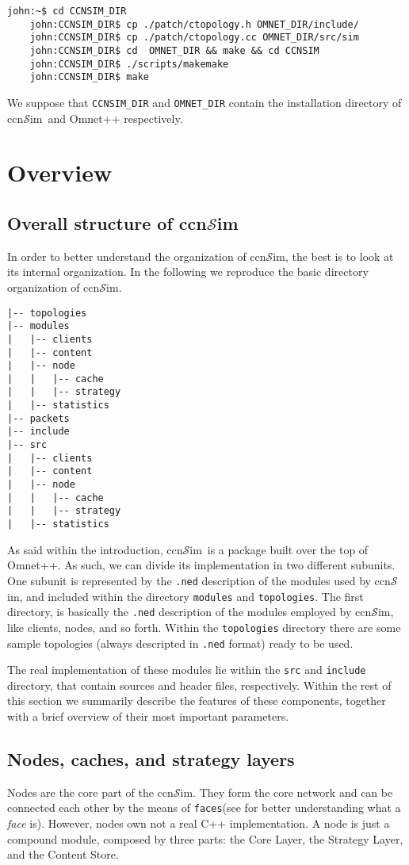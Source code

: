 \documentclass{article}
\newcommand{\ccnsim}{ccn$\mathcal{S}$im}
\begin{document}
\begin{Verbatim}[frame=single]
    john:~$ cd CCNSIM_DIR
    john:CCNSIM_DIR$ cp ./patch/ctopology.h OMNET_DIR/include/
    john:CCNSIM_DIR$ cp ./patch/ctopology.cc OMNET_DIR/src/sim
    john:CCNSIM_DIR$ cd  OMNET_DIR && make && cd CCNSIM
    john:CCNSIM_DIR$ ./scripts/makemake
    john:CCNSIM_DIR$ make
\end{Verbatim}
We suppose that \verb|CCNSIM_DIR| and \verb|OMNET_DIR| contain the installation directory of \ccnsim\ and Omnet++ respectively. 
\section{Overview}
\subsection{Overall structure of \ccnsim}
In order to better understand the organization of \ccnsim, the best is to look at its internal organization. In the following we reproduce the basic directory organization of \ccnsim. 
\begin{Verbatim}[frame=single]
|-- topologies
|-- modules
|   |-- clients
|   |-- content
|   |-- node
|   |   |-- cache
|   |   |-- strategy
|   |-- statistics
|-- packets
|-- include
|-- src
|   |-- clients
|   |-- content
|   |-- node
|   |   |-- cache
|   |   |-- strategy
|   |-- statistics
\end{Verbatim}
As said within the introduction, \ccnsim\ is a package built over the top of Omnet++. As such, we can divide its implementation in two different subunits. One subunit is represented by the \verb|.ned| description of the modules used by \ccnsim, and included within the directory \verb|modules| and \verb|topologies|. The first directory, is basically the \verb|.ned| description of the modules employed by \ccnsim, like clients, nodes, and so forth. Within the \verb|topologies| directory there are some sample topologies (always descripted in \verb|.ned| format) ready to be used. 

The real implementation of these modules lie within the \verb|src| and \verb|include| directory, that contain sources and header files, respectively.  Within the rest of this section we summarily  describe the features of these components, together with a brief overview of their most important parameters.

\subsection{Nodes, caches, and strategy layers}
Nodes are the core part of the \ccnsim. They form the core network and can be connected each other by the means of \verb|faces|(see \cite{jacobson09conext} for better understanding what a \emph{face} is). However, nodes own not a real C++ implementation. A node is just a compound module, composed by three parts: the Core Layer, the Strategy Layer, and the Content Store.
\end{document}
